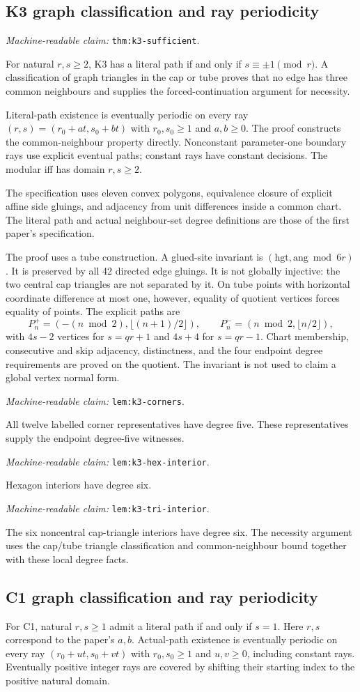 \documentclass[11pt]{amsart}
\newcommand{\record}[1]{\nolinkurl{#1}}
\newcommand{\claimid}[1]{\par\nopagebreak\noindent\textit{Machine-readable claim:} \record{#1}.\par}
\theoremstyle{definition}\newtheorem{definition}{Definition}
\begin{document}
\subsection{K3 graph classification and ray periodicity}\label{thm:k3-sufficient}
\claimid{thm:k3-sufficient}
For natural $r,s\ge2$, K3 has a literal path if and only if
$s\equiv\pm1\pmod r$. A classification of graph triangles in the
cap or tube proves that no edge has three common neighbours and
supplies the forced-continuation argument for necessity.

Literal-path existence is eventually periodic on every ray
$(r,s)=(r_0+at,s_0+bt)$ with $r_0,s_0\ge1$ and $a,b\ge0$.
The proof constructs the common-neighbour property directly.
Nonconstant parameter-one boundary rays use explicit eventual paths;
constant rays have constant decisions. The modular iff has domain
$r,s\ge2$.

The specification uses eleven convex polygons, equivalence closure of
explicit affine side gluings, and adjacency from unit differences inside
a common chart. The literal path and actual neighbour-set degree
 definitions are those of the first paper's specification.

The proof uses a tube construction. A glued-site invariant
is $(\mathrm{hgt},\mathrm{ang}\bmod6r)$. It is preserved by all
42 directed edge gluings. It is not globally injective: the two
central cap triangles are not separated by it. On tube points with
horizontal coordinate difference at most one, however, equality of
quotient vertices forces equality of points. The explicit paths are
\[
 P_n^+=(-(n\bmod2),\lfloor(n+1)/2\rfloor),\qquad
 P_n^-= (n\bmod2,\lfloor n/2\rfloor),
\]
with $4s-2$ vertices for $s=qr+1$ and $4s+4$ for $s=qr-1$.
Chart membership, consecutive and skip adjacency, distinctness, and
the four endpoint degree requirements are proved on the quotient.
The invariant is not used to claim a global vertex normal form.

\label{lem:k3-corners}\claimid{lem:k3-corners}
All twelve labelled corner representatives have degree five. These
representatives supply the endpoint degree-five witnesses.
\label{lem:k3-hex-interior}\claimid{lem:k3-hex-interior}
Hexagon interiors have degree six.
\label{lem:k3-tri-interior}\claimid{lem:k3-tri-interior}
The six noncentral cap-triangle interiors have degree six.
The necessity argument uses the cap/tube triangle classification
and common-neighbour bound together with these local degree facts.

\subsection{C1 graph classification and ray periodicity}\label{sec:c1-formal}
For C1, natural $r,s\ge1$ admit a literal path if and only if $s=1$.
Here $r,s$ correspond to the paper's $a,b$. Actual-path existence is
eventually periodic on every ray $(r_0+ut,s_0+vt)$ with
$r_0,s_0\ge1$ and $u,v\ge0$, including constant rays.
Eventually positive integer rays are covered by shifting their
starting index to the positive natural domain.
\end{document}
